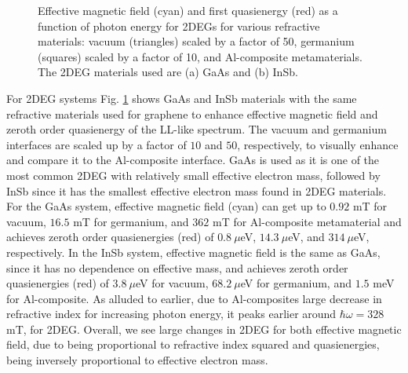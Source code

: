 \begin{figure}
  \caption{Effective magnetic field (cyan) and first quasienergy (red) as a function of photon energy for 2DEGs for various refractive materials: vacuum (triangles) scaled by a factor of 50, germanium (squares) scaled by a factor of 10, and Al-composite metamaterials. The 2DEG materials used are (a) GaAs and (b) InSb.}
  \label{fig:2deg-bfield-energy}
\end{figure}

For 2DEG systems Fig. \ref{fig:2deg-bfield-energy} shows GaAs and InSb materials with the same refractive materials used for graphene to enhance effective magnetic field and zeroth order quasienergy of the LL-like spectrum.
The vacuum and germanium interfaces are scaled up by a factor of $10$ and $50$, respectively, to visually enhance and compare it to the Al-composite interface.
GaAs is used as it is one of the most common 2DEG with relatively small effective electron mass, followed by InSb since it has the smallest effective electron mass found in 2DEG materials.
For the GaAs system, effective magnetic field (cyan) can get up to $0.92$ mT for vacuum, $16.5$ mT for germanium, and $362$ mT for Al-composite metamaterial and achieves zeroth order quasienergies (red) of $0.8\ \mu$eV, $14.3\ \mu$eV, and $314\ \mu$eV, respectively.
In the InSb system, effective magnetic field is the same as GaAs, since it has no dependence on effective mass, and achieves zeroth order quasienergies (red) of $3.8\ \mu$eV for vacuum, $68.2\ \mu$eV for germanium, and $1.5$ meV for Al-composite.
As alluded to earlier, due to Al-composites large decrease in refractive index for increasing photon energy, it peaks earlier around $\hbar\omega=328$ mT, for 2DEG.
Overall, we see large changes in 2DEG for both effective magnetic field, due to being proportional to refractive index squared and quasienergies, being inversely proportional to effective electron mass.

